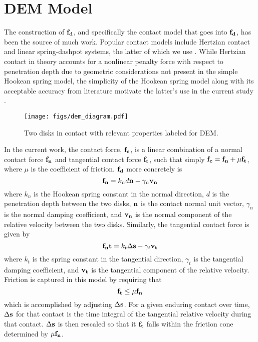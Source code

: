 \section{DEM Model} \label{DEM_Model}
The construction of $\bold{f_d}$, and specifically the contact model that goes into $\bold{f_d}$, has been the source of much work. Popular contact models include Hertzian contact and linear spring-dashpot systems, the latter of which we use \cite{Hertz:1881,Cundall:1979}. While Hertzian contact in theory accounts for a nonlinear penalty force with respect to penetration depth due to geometric considerations not present in the simple Hookean spring model, the simplicity of the Hookean spring model along with its acceptable accuracy from literature motivate the latter's use in the current study \cite{Renzo:2004}. 

\begin{figure}[htp] 
    \centering
    \texttt{[image: figs/dem\_diagram.pdf]}
    \caption{Two disks in contact with relevant properties labeled for DEM.}
    \label{DEM_diagram}
\end{figure}

In the current work, the contact force, $\bold{f_c}$, is a linear combination of a normal contact force $\bold{f_n}$ and tangential contact force $\bold{f_t}$, such that simply $\bold{f_c} = \bold{f_n} + \mu\bold{f_t}$, where $\mu$ is the coefficient of friction. $\bold{f_d}$ more concretely is
$$\bold{f_n}=k_nd\bold{n}-\gamma_n\bold{v_n}$$
where $k_n$ is the Hookean spring constant in the normal direction, $d$ is the penetration depth between the two disks, $\bold{n}$ is the contact normal unit vector, $\gamma_n$ is the normal damping coefficient, and $\bold{v_n}$ is the normal component of the relative velocity between the two disks. Similarly, the tangential contact force is given by
$$\bold{f_nt}=k_t\Delta\bold{s}-\gamma_t\bold{v_t}$$
where $k_t$ is the spring constant in the tangential direction, $\gamma_t$ is the tangential damping coefficient, and $\bold{v_t}$ is the tangential component of the relative velocity. Friction is captured in this model by requiring that
$$\bold{f_t}\leq\mu\bold{f_n}$$
which is accomplished by adjusting $\Delta\bold{s}$. For a given enduring contact over time, $\Delta\bold{s}$ for that contact is the time integral of the tangential relative velocity during that contact. $\Delta\bold{s}$ is then rescaled so that it $\bold{f_t}$ falls within the friction cone determined by $\mu\bold{f_n}$.

